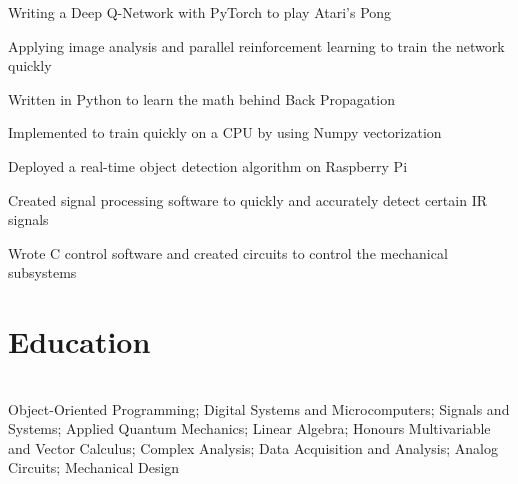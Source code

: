 \documentclass[]{deedy-resume-openfont}
\begin{document}
\begin{tightemize}
    \item Writing a Deep Q-Network with PyTorch to play Atari's Pong
    \item Applying image analysis and parallel reinforcement learning to train the network quickly
\end{tightemize}

\vspace{8pt}

\begin{tightemize}
    \item Written in Python to learn the math behind Back Propagation 
    \item Implemented to train quickly on a CPU by using Numpy vectorization
\end{tightemize}

\vspace{8pt}

\begin{tightemize}
    \item Deployed a real-time object detection algorithm on Raspberry Pi
    \item Created signal processing software to quickly and accurately detect certain IR signals
    \item Wrote C control software and created circuits to control the mechanical subsystems
\end{tightemize}

\vspace{12pt}


\section{Education}

\begin{adjustwidth}{0.55cm}{1.25cm}
     \\
     Object-Oriented Programming; Digital Systems and Microcomputers; Signals and Systems; Applied Quantum Mechanics; Linear Algebra; Honours Multivariable and Vector Calculus; Complex Analysis; Data Acquisition and Analysis; Analog Circuits; Mechanical Design
\end{adjustwidth}
\vspace{8pt}
\end{document}
